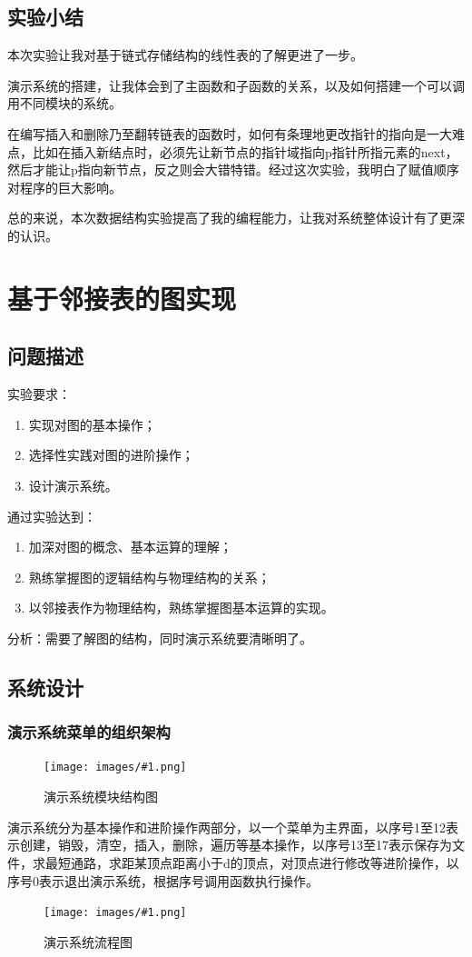 \documentclass[supercite]{Experimental_Report}
\newcommand{\cfig}[3]{
	\begin{figure}[htb]
		\centering
		\texttt{[image: images/\#1.png]}
		\caption{#3}
		\label{fig:#1}
	\end{figure}
}
\theoremstyle{definition}
\begin{document}
\subsection{实验小结}
本次实验让我对基于链式存储结构的线性表的了解更进了一步。\par
演示系统的搭建，让我体会到了主函数和子函数的关系，以及如何搭建一个可以调用不同模块的系统。\par
在编写插入和删除乃至翻转链表的函数时，如何有条理地更改指针的指向是一大难点，比如在插入新结点时，必须先让新节点的指针域指向p指针所指元素的next，然后才能让p指向新节点，反之则会大错特错。经过这次实验，我明白了赋值顺序对程序的巨大影响。\par
总的来说，本次数据结构实验提高了我的编程能力，让我对系统整体设计有了更深的认识。
\clearpage

\section{基于邻接表的图实现}
\subsection{问题描述}
\noindent 实验要求：
\begin{enumerate}
	\item 实现对图的基本操作；
	\item 选择性实践对图的进阶操作；
	\item 设计演示系统。
\end{enumerate}
通过实验达到：
\begin{enumerate}
	\item 加深对图的概念、基本运算的理解；	
	\item 熟练掌握图的逻辑结构与物理结构的关系；
	\item 以邻接表作为物理结构，熟练掌握图基本运算的实现。
\end{enumerate}
分析：需要了解图的结构，同时演示系统要清晰明了。

\subsection{系统设计}

\subsubsection{演示系统菜单的组织架构}
\cfig{2.3}{0.6}{演示系统模块结构图}
\newpage
\quad 演示系统分为基本操作和进阶操作两部分，以一个菜单为主界面，以序号1至12表示创建，销毁，清空，插入，删除，遍历等基本操作，以序号13至17表示保存为文件，求最短通路，求距某顶点距离小于d的顶点，对顶点进行修改等进阶操作，以序号0表示退出演示系统，根据序号调用函数执行操作。
\cfig{2.4}{0.8}{演示系统流程图}
\end{document}
